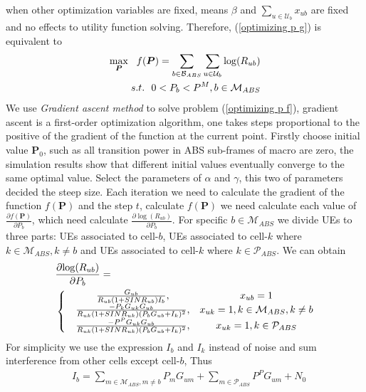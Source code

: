 \documentclass[journal]{IEEETran}
\begin{document}
when other optimization variables are fixed, means $\beta$ and $\sum\limits_{u \in \mathcal{U}_b} x_{ub}$ are fixed and no effects to utility function solving. Therefore, (\ref{optimizing p g}) is equivalent to
\begin{align} \label{optimizing p f}
 \max_{\bm{P}}~~f(\bm{P}) = \sum_{b \in \mathcal{B}_{ABS}} \sum_{u \in \mathcal{U}_b} \log(R_{ub}) \\
 s.t.~~0 < P_b < P^{M}, b \in \mathcal{M}_{ABS} \notag
\end{align}
We use \textit{Gradient ascent method} \cite{ConvexOptimization} to solve problem (\ref{optimizing p f}), gradient ascent is a first-order optimization algorithm, one takes steps proportional to the positive of the gradient of the function at the current point. Firstly choose initial value $\bm{P}_0$, such as all transition power in ABS sub-frames of macro are zero, the simulation results show that different initial values eventually converge to the same optimal value. Select the parameters of $\alpha$ and $\gamma$, this two of parameters decided the steep size. Each iteration we need to calculate the gradient of the function $f(\bm{P})$ and the step $t$, calculate $f(\bm{P})$ we need calculate each value of $\frac{\partial f(\bm{P})}{\partial P_b}$, which need calculate $\frac{\partial{\log(R_{ub})}}{\partial P_b}$. For specific $b \in \mathcal{M}_{ABS}$ we divide UEs to three parts: UEs associated to cell-$b$, UEs associated to cell-$k$ where $k \in \mathcal{M}_{ABS}, k \neq b$ and UEs associated to cell-$k$ where $k \in \mathcal{P}_{ABS}$. We can obtain
\begin{align}\label{GradientR}
&\frac{\partial{\log(R_{ub})}}{\partial P_b} = \\ \notag
&\left\{
\begin{matrix}
&\frac{G_{ub}}{R_{ub}(1 + SINR_{ub}) I_b}, &x_{ub}=1 \\
&\frac{-P_k G_{uk} G_{ub}}{R_{uk}(1 + SINR_{uk})(P_b G_{ub} + I_k)^ 2 },& x_{uk}=1, k \in \mathcal{M}_{ABS}, k \neq b \\
&\frac{-P^P G_{uk} G_{ub}}{R_{uk}(1 + SINR_{uk})(P_b G_{ub} + I_k)^ 2 }, &x_{uk}=1, k \in \mathcal{P}_{ABS}
\end{matrix}
\right.
\end{align}
For simplicity we use the expression $I_b$ and $I_k$ instead of noise and sum interference from other cells except cell-$b$,
Thus
\begin{align}\label{GradientR}
&I_b = \sum\limits_{m \in \mathcal{M}_{ABS},m \ne b} {{P_m}{G_{um}} + \sum\limits_{m \in \mathcal{P}_{ABS}} {{P^{P}}{G_{um}} + {N_0}}}
\end{align}
\end{document}
